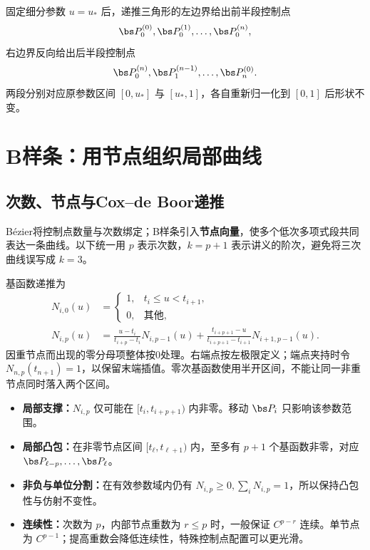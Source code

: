 固定细分参数 $u=u_*$ 后，递推三角形的左边界给出前半段控制点
\[
 \bs P_0^{(0)},\bs P_0^{(1)},\ldots,\bs P_0^{(n)},
\]
右边界反向给出后半段控制点
\[
 \bs P_0^{(n)},\bs P_1^{(n-1)},\ldots,\bs P_n^{(0)}.
\]
两段分别对应原参数区间 $[0,u_*]$ 与 $[u_*,1]$，各自重新归一化到 $[0,1]$ 后形状不变。



\section{B样条：用节点组织局部曲线}

\subsection{次数、节点与Cox--de Boor递推}
Bézier将控制点数量与次数绑定；B样条引入\textbf{节点向量}，使多个低次多项式段共同表达一条曲线。以下统一用 $p$ 表示次数，$k=p+1$ 表示讲义的阶次，避免将三次曲线误写成 $k=3$。


基函数递推为
\begin{align*}
 N_{i,0}(u)&=\begin{cases}1,&t_i\leq u<t_{i+1},\\0,&\text{其他},\end{cases}\\
 N_{i,p}(u)&=\frac{u-t_i}{t_{i+p}-t_i}N_{i,p-1}(u)
 +\frac{t_{i+p+1}-u}{t_{i+p+1}-t_{i+1}}N_{i+1,p-1}(u).
\end{align*}
因重节点而出现的零分母项整体按0处理。右端点按左极限定义；端点夹持时令 $N_{n,p}(t_{n+1})=1$，以保留末端插值。零次基函数使用半开区间，不能让同一非重节点同时落入两个区间。

\begin{itemize}
 \item \textbf{局部支撑：}$N_{i,p}$ 仅可能在 $[t_i,t_{i+p+1})$ 内非零。移动 $\bs P_i$ 只影响该参数范围。
 \item \textbf{局部凸包：}在非零节点区间 $[t_\ell,t_{\ell+1})$ 内，至多有 $p+1$ 个基函数非零，对应 $\bs P_{\ell-p},\ldots,\bs P_\ell$。
 \item \textbf{非负与单位分割：}在有效参数域内仍有 $N_{i,p}\geq0,\sum_iN_{i,p}=1$，所以保持凸包性与仿射不变性。
 \item \textbf{连续性：}次数为 $p$，内部节点重数为 $r\leq p$ 时，一般保证 $C^{p-r}$ 连续。单节点为 $C^{p-1}$；提高重数会降低连续性，特殊控制点配置可以更光滑。
\end{itemize}

